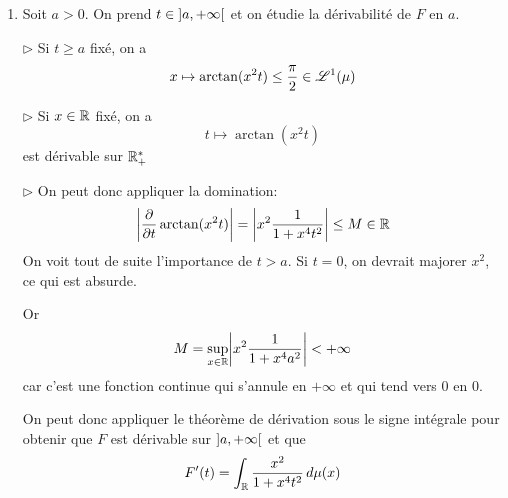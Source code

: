{\begin{nntd-sol}[]
\begin{enumerate}
            Pour l'argument de domination, on a la majoration et par le théorème
            de continuité sous le signe intégrale, on a \(F\) continue sur \(\R_+^\ast\).

            Enfin, pour \(t=0\), on regarde la limite à droite.
            \(\triangleright\) Le même argument de domination nous donne que
            \begin{equation*}
                \lim_{n\to+\infty}\arctan{x t_n} = \arctan(0) = 0
            \end{equation*}
            et donc
            \begin{equation*}
                F(0)=\int 0 = 0
            \end{equation*}
            et donc \(F\) est continue sur \(\R_+\).

            \item Soit \(a>0\). On prend \(t\in\mathopen{}\left]a,+\infty\right[\mathclose{}\) et on étudie la dérivabilité de \(F\) en \(a\).

            \(\triangleright\) Si \(t\geq a\) fixé, on a
            \begin{equation*}
                x\mapsto \arctan(x^2t) \leq \frac{\pi}{2}\in\mathscr{L}^1(\mu)
            \end{equation*}

            \(\triangleright\) Si \(x\in \mathbb{R}\) fixé, on a
            \begin{equation*}
                t\mapsto \arctan(x^2t)
            \end{equation*}
            est dérivable sur \(\R_+^\ast\)

            \(\triangleright\) On peut donc appliquer la domination:
            \begin{equation*}
                \mathopen{}\left|\frac{\partial}{\partial t}\arctan(x^2t)\right|\mathclose{}
                = \mathopen{}\left|x^2\frac{1}{1+x^4t^2}\right|\mathclose{}\leq M\in\mathbb{R}
            \end{equation*}
            On voit tout de suite l'importance de \(t>a\). Si \(t=0\), on
            devrait majorer \(x^2\), ce qui est absurde.

            Or
            \begin{equation*}
                M = \sup_{x\in\mathbb{R}}\mathopen{}\left|x^2\frac{1}{1+x^4a^2}\right|\mathclose{}<+\infty
            \end{equation*}
            car c'est une fonction continue qui s'annule en \(+\infty\) et qui tend
            vers 0 en 0.

            On peut donc appliquer le théorème de dérivation sous le signe intégrale
            pour obtenir que \(F\) est dérivable sur \(\mathopen{}\left]a,+\infty\right[\mathclose{}\) et que
            \begin{equation}
                F'(t) = \int_{\mathbb{R}}\frac{x^2}{1+x^4t^2}\mathop{}\!{d}\mu(x)\label{eq:arctan_exo_7_3}
            \end{equation}


\end{enumerate}
\end{nntd-sol}}
